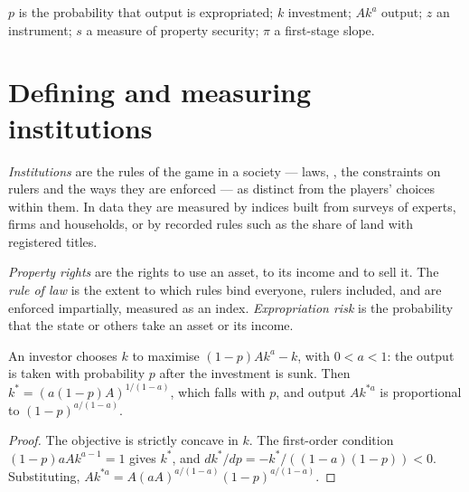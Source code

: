\begin{notation}\label{not:b3:institutions:symbols}
$p$ is the probability that output is expropriated; $k$ investment; $A k^{a}$ output; $z$ an
instrument; $s$ a measure of property security; $\pi$ a first-stage slope.
\end{notation}

\section{Defining and measuring institutions}\label{sec:b3:institutions:defining}

\begin{definition}[Institutions]\label{def:b3:institutions:institutions}
\emph{Institutions} are the rules of the game in a society --- laws, ,
the constraints on rulers and the ways they are enforced --- as distinct from the
players' choices within them. In data they are measured by indices built from
surveys of experts, firms and households, or by recorded rules such as the share of
land with registered titles.
\end{definition}

\begin{definition}\label{def:b3:institutions:property-rights}
\emph{Property rights} are the rights to use an asset, to its income and to sell it.
The \emph{rule of law} is the extent to which rules bind everyone, rulers included,
and are enforced impartially, measured as an index. \emph{Expropriation risk} is the
probability that the state or others take an asset or its income.
\end{definition}

\begin{proposition}\label{prop:b3:institutions:holdup}
An investor chooses $k$ to maximise $(1 - p)A k^{a} - k$, with $0 < a < 1$: the output is taken with probability $p$ after the
investment is sunk. Then $k^* = (a(1 - p)A)^{1/(1 - a)}$, which falls with $p$, and output $A k^{*a}$ is proportional to $(1 - p)^{a/(1 - a)}$.
\end{proposition}

\begin{proof}
The objective is strictly concave in $k$. The first-order condition $(1 - p)aA k^{a - 1} = 1$ gives $k^*$, and $dk^*/dp = -k^*/((1 - a)(1 - p)) < 0$.
Substituting, $A k^{*a} = A(aA)^{a/(1 - a)}(1 - p)^{a/(1 - a)}$.
\end{proof}

